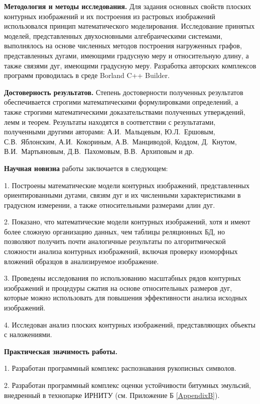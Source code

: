 \textbf{Методология и методы исследования.} Для задания основных свойств  плоских контурных изображений и их построения из растровых изображений использовался  принцип математического моделирования. Исследование принятых моделей, представленных двухосновными алгебраическими системами, выполнялось на основе численных методов построения нагруженных графов, представленных дугами, имеющими градусную меру и относительную длину, а также связями дуг, имеющими градусную меру. Разработка авторских комплексов программ проводилась в среде Borland C++ Builder. 


\textbf{Достоверность  результатов.} Степень достоверности полученных результатов обеспечивается строгими математическими формулировками определений, а также строгими математическими доказательствами полученных утверждений, лемм и теорем.
Результаты находятся в соответствии с результатами, полученными другими авторами:  А.И.~Мальцевым\cite{D12}, Ю.Л.~Ершовым\cite{D12}, С.В.~Яблонским\cite{D21}, А.И.~Кокориным\cite{D10}, А.В.~Манциводой\cite{D13},  Коддом\cite{D25}, Д.~Кнутом\cite{D9}, В.И.~Мартьяновым\cite{Samara}, Д.В.~Пахомовым\cite{D16}, В.В.~Архиповым\cite{D15} и др\cite{D1,D2,D3,D11}.

\textbf{Научная новизна} работы заключается в следующем: 

1. Построены математические модели контурных изображений, представленных ориентированными дугами, связям дуг и их численными характеристиками в градусном измерении,  а также  относительными размерами  длин дуг.  

2. Показано, что математические модели контурных изображений, хотя и имеют более сложную организацию данных, чем  таблицы реляционных БД, но позволяют получить почти аналогичные результаты по алгоритмической сложности  анализа контурных изображений, включая проверку изоморфных вложений образцов в анализируемое изображение.

3. Проведены исследования по использованию масштабных рядов контурных изображений и процедуры сжатия на  основе относительных размеров дуг, которые можно использовать для повышения эффективности анализа исходных изображений.

4. Исследован анализ плоских контурных изображений, представляющих объекты с наложениями.

\textbf{Практическая значимость работы.}

1. Разработан  программный комплекс распознавания рукописных символов.

2. Разработан  программный комплекс оценки устойчивости битумных эмульсий, внедренный в технопарке  ИРНИТУ (см. Приложение Б \ref{AppendixB}).

